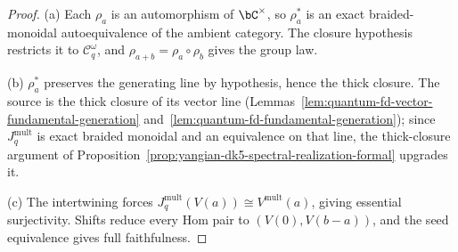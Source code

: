 \begin{proof}
\textup{(a)}
Each \(\rho_a\) is an automorphism of \(\bC^\times\), so \(\rho_a^*\)
is an exact braided-monoidal autoequivalence of the ambient category.
The closure hypothesis restricts it to \(\mathcal C_q^\omega\), and
\(\rho_{a+b}=\rho_a\circ\rho_b\) gives the group law.

\textup{(b)}
\(\rho_a^*\) preserves the generating line by hypothesis, hence the
thick closure. The source is the thick closure of its vector line
(Lemmas~\ref{lem:quantum-fd-vector-fundamental-generation}
and~\ref{lem:quantum-fd-fundamental-generation}); since
\(J_q^{\mathrm{mult}}\) is exact braided monoidal and an equivalence
on that line, the thick-closure argument of
Proposition~\ref{prop:yangian-dk5-spectral-realization-formal}
upgrades it.

\textup{(c)}
The intertwining forces
\(J_q^{\mathrm{mult}}(V(a))\cong V^{\mathrm{mult}}(a)\), giving
essential surjectivity. Shifts reduce every Hom pair to
\((V(0),V(b-a))\), and the seed equivalence gives full faithfulness.
\end{proof}

